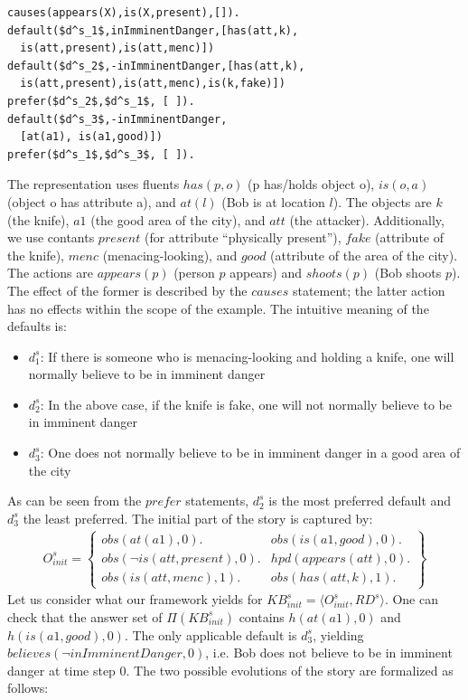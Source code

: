 \documentclass{article}
\begin{document}
\begin{lstlisting}[language=clingo,caption=Set $RD^s$ of statements for the self-defense example, label=lst:pi_S, mathescape=true,xleftmargin=.01\textwidth, breaklines=true]
causes(appears(X),is(X,present),[]).
default($d^s_1$,inImminentDanger,[has(att,k),
  is(att,present),is(att,menc)])
default($d^s_2$,-inImminentDanger,[has(att,k),
  is(att,present),is(att,menc),is(k,fake)])
prefer($d^s_2$,$d^s_1$, [ ]).
default($d^s_3$,-inImminentDanger,
  [at(a1), is(a1,good)])
prefer($d^s_1$,$d^s_3$, [ ]).
\end{lstlisting}
The representation uses fluents $has(p,o)$ (p has/holds object o), $is(o,a)$ (object o has attribute a), and $at(l)$ (Bob is at location $l$). The objects are $k$ (the knife), $a1$ (the good area of the city), and $att$ (the attacker). Additionally, we use contants $present$ (for attribute ``physically present''), $fake$ (attribute of the knife), $menc$ (menacing-looking), and $good$ (attribute of the area of the city). The actions are $appears(p)$ (person $p$ appears) and $shoots(p)$ (Bob shoots $p$). The effect of the former is described by the $causes$ statement; the latter action has no effects within the scope of the example. The intuitive meaning of the defaults is:
\begin{itemize}
\item $d^s_1$: If there is someone who is menacing-looking and holding a knife, one will normally believe to be in imminent danger
\item $d^s_2$: In the above case, if the knife is fake, one will not normally believe to be in imminent danger
\item $d^s_3$: One does not normally believe to be in imminent danger in a good area of the city
\end{itemize} 
As can be seen from the $prefer$ statements, $d^s_2$ is the most preferred default and $d^s_3$ the least preferred.
The initial part of the story is captured by:
\[
\begin{array}{lll}
O^s_{init}  =  \left\{
\begin{array}{ll} 
obs(at(a1),0).   %
& obs(is(a1,good),0). \\
obs(\neg is(att,present),0). & 
hpd(appears(att),0). \\    %
obs(is(att,menc),1). &  %
obs(has(att,k),1).
\end{array}
\right\}
\end{array}
\]
Let us consider what our framework yields for $KB^s_{init}=\langle O^s_{init},RD^s \rangle$. One can check that the answer set of $\Pi(KB^s_{init})$ contains $h(at(a1),0)$ and $h(is(a1,good),0)$. The only applicable default is $d^s_3$, yielding $believes(\neg inImminentDanger,0)$, i.e. Bob does not believe to be in imminent danger at time step $0$. The two possible evolutions of the story are formalized as follows:
\end{document}
